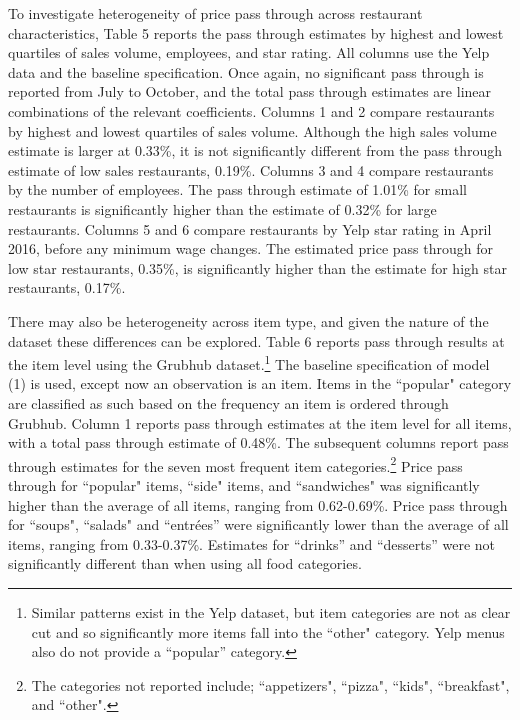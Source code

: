 \documentclass[11pt]{article}
\begin{document}
To investigate heterogeneity of price pass through across restaurant characteristics, Table 5 reports the pass through estimates by highest and lowest quartiles of sales volume, employees, and star rating. All columns use the Yelp data and the baseline specification. Once again, no significant pass through is reported from July to October, and the total pass through estimates are linear combinations of the relevant coefficients. Columns 1 and 2 compare restaurants by highest and lowest quartiles of sales volume. Although the high sales volume estimate is larger at 0.33\%, it is not significantly different from the pass through estimate of low sales restaurants, 0.19\%. Columns 3 and 4 compare restaurants by the number of employees. The pass through estimate of 1.01\% for small restaurants is significantly higher than the estimate of 0.32\% for large restaurants. Columns 5 and 6 compare restaurants by Yelp star rating in April 2016, before any minimum wage changes. The estimated price pass through for low star restaurants, 0.35\%, is significantly higher than the estimate for high star restaurants, 0.17\%.       

There may also be heterogeneity across item type, and given the nature of the dataset these differences can be explored. Table 6 reports pass through results at the item level using the Grubhub dataset.\footnote{Similar patterns exist in the Yelp dataset, but item categories are not as clear cut and so significantly more items fall into the ``other" category. Yelp menus also do not provide a ``popular'' category.} The baseline specification of model (1) is used, except now an observation is an item. Items in the ``popular" category are classified as such based on the frequency an item is ordered through Grubhub. Column 1 reports pass through estimates at the item level for all items, with a total pass through estimate of 0.48\%. The subsequent columns report pass through estimates for the seven most frequent item categories.\footnote{The categories not reported include; ``appetizers", ``pizza", ``kids", ``breakfast", and ``other".} Price pass through for ``popular" items, ``side" items, and ``sandwiches" was significantly higher than the average of all items, ranging from 0.62-0.69\%. Price pass through  for ``soups", ``salads" and ``entrées'' were significantly lower than the average of all items, ranging from 0.33-0.37\%. Estimates for ``drinks'' and ``desserts'' were not significantly different than when using all food categories. 
\end{document}
